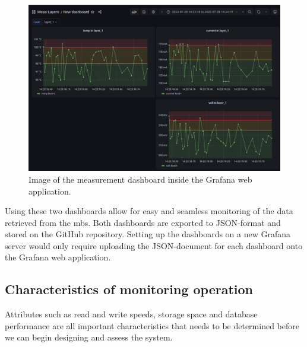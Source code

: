 \documentclass[main.tex]{subfiles}
\begin{document}
\begin{figure}[!htpb]
    \centering
    \includegraphics[width=15cm, scale=4]{images/grafana_2nd_dashboard.png}
    \caption{Image of the measurement dashboard inside the Grafana web application.}
    \label{fig: grafana second}
\end{figure}
\FloatBarrier

Using these two dashboards allow for easy and seamless monitoring of the data retrieved from the \gls{mb}s. Both dashboards are exported to JSON-format and stored on the GitHub repository. Setting up the dashboards on a new Grafana server would only require uploading the JSON-document for each dashboard onto the Grafana web application.



\subsection{Characteristics of monitoring operation}
\label{ssec: char_mon}
Attributes such as read and write speeds, storage space and database performance are all important characteristics that needs to be determined before we can begin designing and assess the system.
\end{document}
